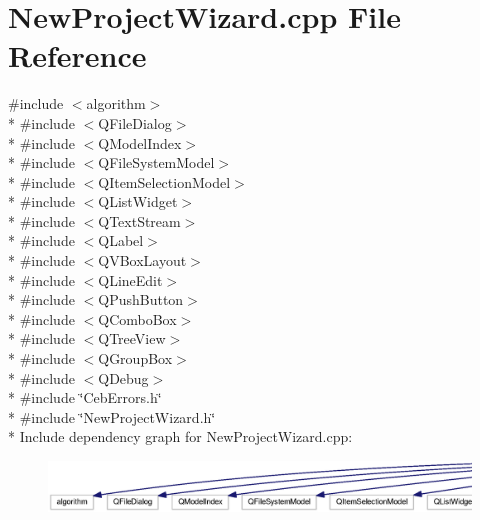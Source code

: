 \section{New\-Project\-Wizard.\-cpp File Reference}
\label{_new_project_wizard_8cpp}
{\ttfamily \#include $<$algorithm$>$}\\*
{\ttfamily \#include $<$Q\-File\-Dialog$>$}\\*
{\ttfamily \#include $<$Q\-Model\-Index$>$}\\*
{\ttfamily \#include $<$Q\-File\-System\-Model$>$}\\*
{\ttfamily \#include $<$Q\-Item\-Selection\-Model$>$}\\*
{\ttfamily \#include $<$Q\-List\-Widget$>$}\\*
{\ttfamily \#include $<$Q\-Text\-Stream$>$}\\*
{\ttfamily \#include $<$Q\-Label$>$}\\*
{\ttfamily \#include $<$Q\-V\-Box\-Layout$>$}\\*
{\ttfamily \#include $<$Q\-Line\-Edit$>$}\\*
{\ttfamily \#include $<$Q\-Push\-Button$>$}\\*
{\ttfamily \#include $<$Q\-Combo\-Box$>$}\\*
{\ttfamily \#include $<$Q\-Tree\-View$>$}\\*
{\ttfamily \#include $<$Q\-Group\-Box$>$}\\*
{\ttfamily \#include $<$Q\-Debug$>$}\\*
{\ttfamily \#include \char`\"{}Ceb\-Errors.\-h\char`\"{}}\\*
{\ttfamily \#include \char`\"{}New\-Project\-Wizard.\-h\char`\"{}}\\*
Include dependency graph for New\-Project\-Wizard.\-cpp\-:\nopagebreak
\begin{figure}[H]
\begin{center}
\leavevmode
\includegraphics[width=350pt]{_new_project_wizard_8cpp__incl}
\end{center}
\end{figure}
